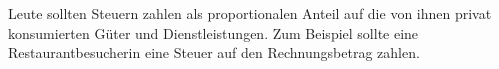 Leute sollten Steuern zahlen als proportionalen Anteil auf die von ihnen privat konsumierten Güter und Dienstleistungen.
Zum Beispiel sollte eine Restaurantbesucherin eine Steuer auf den Rechnungsbetrag zahlen.